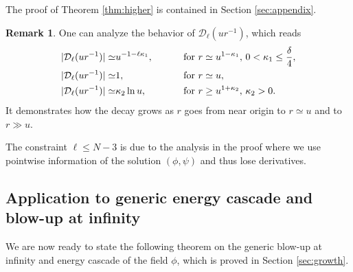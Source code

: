 \documentclass[a4paper,reqno]{amsart}
\theoremstyle{definition}
\newtheorem{remark}[theorem]{Remark}
\numberwithin{equation}{section}
\begin{document}
 The proof of Theorem \ref{thm:higher} is contained in Section \ref{sec:appendix}.
 
\begin{remark}
    One can analyze the behavior of $\mathcal{D}_\ell({u r^{-1}})$, which reads
    \begin{align*}
        |\mathcal{D}_\ell({u r^{-1}})| 
        \simeq & u^{-1-\ell \kappa_1},
        \qquad
        &&\text{ for }  r\simeq u^{1-\kappa_1}, \, 0<\kappa_1\leq {\delta\over 4},
        \\
        |\mathcal{D}_\ell({u r^{-1}})| 
        \simeq &1,
        \qquad
        &&\text{ for }  r \simeq u,
        \\
        |\mathcal{D}_\ell({u r^{-1}})| 
        \simeq & \kappa_2 \ln u,
        \qquad
        &&\text{ for }  r \geq u^{1+\kappa_2}, \, \kappa_2>0.
    \end{align*}
    It demonstrates how the decay grows as $r$ goes from near origin to $r\simeq u$ and to $r \gg u$. 
    
    The constraint $\ell \leq N-3$ is due to the analysis in the proof where we use pointwise information of the solution $(\phi, \psi)$ and thus lose derivatives.
\end{remark}


\subsection{Application to generic energy cascade and blow-up at infinity}

We are now ready to state the following theorem on the generic blow-up at infinity and energy cascade of the field $\phi$, which is proved in Section \ref{sec:growth}. 
\end{document}
